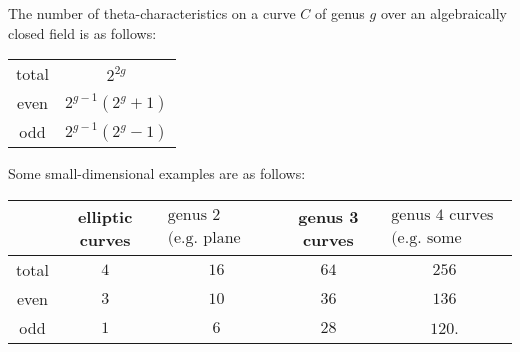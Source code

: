 \documentclass[11pt]{amsart}
\begin{document}
\begin{proposition} The number of theta-characteristics on a curve $C$ of genus $g$ over an algebraically closed field is as follows:
\begin{center}
    \begin{tabular}{c c}
    total & $2^{2g}$ \\
    even & $2^{g-1}(2^g+1)$ \\
    odd & $2^{g-1}(2^g - 1)$
    \end{tabular}
\end{center}
Some small-dimensional examples are as follows:
\begin{center}
    \begin{tabular}{c | c c c c }
    & elliptic curves & $\substack{\text{genus 2 curves} \\ \text{(e.g. plane quartics)}}$ & genus 3 curves & $\substack{\text{genus 4 curves} \\\text{(e.g. some space sextics)}}$ \\
    \hline
    total   & $4$   & $16$  & $64$  & $256$\\
    even    & $3$   & $10$  & $36$  & $136$\\
    odd     & $1$   & $6$   & $28$  & $120$.
    \end{tabular}
\end{center}
\end{proposition}







\end{document}
